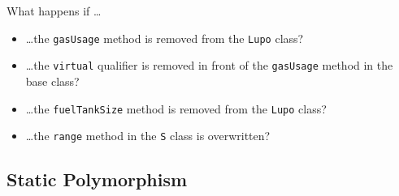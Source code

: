 \begin{exc}
What happens if \dots 
\begin{itemize}
\item \dots the \texttt{gasUsage} method is removed from the \texttt{Lupo} class?
\item \dots the \texttt{virtual} qualifier is removed in front of the
  \texttt{gasUsage} method in the base class?
\item \dots the \texttt{fuelTankSize} method is removed from the \texttt{Lupo} class?
\item \dots the \texttt{range} method in the \texttt{S} class is
  overwritten?
\end{itemize}
\end{exc}

\subsection*{Static Polymorphism}








